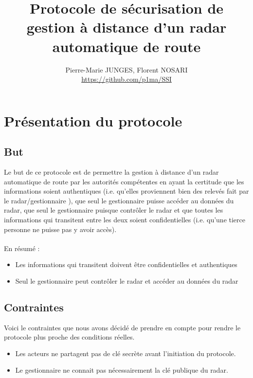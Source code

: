 \documentclass[]{scrartcl}
\title{Protocole de sécurisation de gestion à distance d'un radar automatique de route}
\author{Pierre-Marie JUNGES, Florent NOSARI \\ \url{https://github.com/p1ma/SSI}}
\begin{document}
\maketitle

\begin{abstract}

\end{abstract}

\section{Présentation du protocole}

\subsection{But}

Le but de ce protocole est de permettre la gestion à distance d'un radar automatique de route par les autorités compétentes en ayant la certitude que les informations soient authentiques (i.e. qu'elles proviennent bien des relevés fait par le radar/gestionnaire ), que seul le gestionnaire puisse accéder au données du radar, que seul le gestionnaire puisque contrôler le radar et que toutes les informations qui transitent entre les deux soient confidentielles (i.e. qu'une tierce personne ne puisse pas y avoir accès).
\\
\\
En résumé :
\\
\begin{itemize}
	\item Les informations qui transitent doivent être confidentielles et authentiques
	\item Seul le gestionnaire peut contrôler le radar et accéder au données du radar
\end{itemize}

\subsection{Contraintes}

Voici le contraintes que nous avons décidé de prendre en compte pour rendre le protocole plus proche des conditions réelles.
\begin{itemize}
	\item Les acteurs ne partagent pas de clé secrète avant l'initiation du protocole.
	\item Le gestionnaire ne connait pas nécessairement la clé publique du radar.
\end{itemize}
\end{document}
